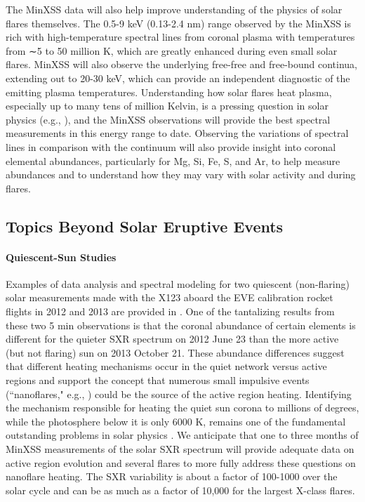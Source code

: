 The MinXSS data will also help improve understanding of the physics of solar flares themselves. The 0.5-9 keV (0.13-2.4 nm) range observed by the MinXSS is rich with high-temperature spectral lines from coronal plasma with temperatures from ∼5 to 50 million K, which are greatly enhanced during even small solar flares. MinXSS will also observe the underlying free-free and free-bound continua, extending out to 20-30 keV, which can provide an independent diagnostic of the emitting plasma temperatures. Understanding how solar flares heat plasma, especially up to many tens of million Kelvin, is a pressing question in solar physics (e.g., \citealt{Caspi2010, Fletcher2011, Caspi2014}), and the MinXSS observations will provide the best spectral measurements in this energy range to date. Observing the variations of spectral lines in comparison with the continuum will also provide insight into coronal elemental abundances, particularly for Mg, Si, Fe, S, and Ar, to help measure abundances and to understand how they may vary with solar activity and during flares.

\subsection{Topics Beyond Solar Eruptive Events}
\paragraph{Quiescent-Sun Studies}
Examples of data analysis and spectral modeling for two quiescent (non-flaring) solar measurements made with the X123 aboard the EVE calibration rocket flights in 2012 and 2013 are provided in \citet{Caspi2015}. One of the tantalizing results from these two 5 min observations is that the coronal abundance of certain elements is different for the quieter SXR spectrum on 2012 June 23 than the more active (but not flaring) sun on 2013 October 21. These abundance differences suggest that different heating mechanisms occur in the quiet network versus active regions and support the concept that numerous small impulsive events (``nanoflares," e.g., \citealt{Rodgers2006, Parker1988}) could be the source of the active region heating. Identifying the mechanism responsible for heating the quiet sun corona to millions of degrees, while the photosphere below it is only 6000 K, remains one of the fundamental outstanding problems in solar physics \citep{Klimchuk2006}. We anticipate that one to three months of MinXSS measurements of the solar SXR spectrum will provide adequate data on active region evolution and several flares to more fully address these questions on nanoflare heating. The SXR variability is about a factor of 100-1000 over the solar cycle and can be as much as a factor of 10,000 for the largest X-class flares. 

